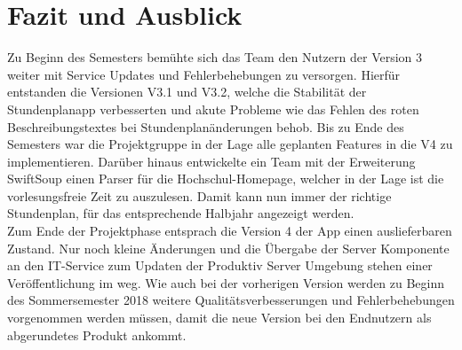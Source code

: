 \section{Fazit und Ausblick}
Zu Beginn des Semesters bemühte sich das Team den Nutzern der Version 3 weiter mit Service Updates und Fehlerbehebungen zu versorgen. Hierfür entstanden die Versionen V3.1 und V3.2, welche die Stabilität der Stundenplanapp verbesserten und akute Probleme wie das Fehlen des roten Beschreibungstextes bei Stundenplanänderungen behob.
Bis zu Ende des Semesters war die Projektgruppe in der Lage alle geplanten Features in die V4 zu implementieren. Darüber hinaus entwickelte ein Team mit der Erweiterung SwiftSoup einen Parser für die Hochschul-Homepage, welcher in der Lage ist die vorlesungsfreie Zeit zu auszulesen. Damit kann nun immer der richtige Stundenplan, für das entsprechende Halbjahr angezeigt werden.\\

Zum Ende der Projektphase entsprach die Version 4 der App einen auslieferbaren Zustand. Nur noch kleine Änderungen und die Übergabe der Server Komponente an den IT-Service zum Updaten der Produktiv Server Umgebung stehen einer Veröffentlichung im weg.
Wie auch bei der vorherigen Version werden zu Beginn des Sommersemester 2018 weitere Qualitätsverbesserungen und Fehlerbehebungen vorgenommen  werden müssen, damit die neue Version bei den Endnutzern als abgerundetes Produkt ankommt.